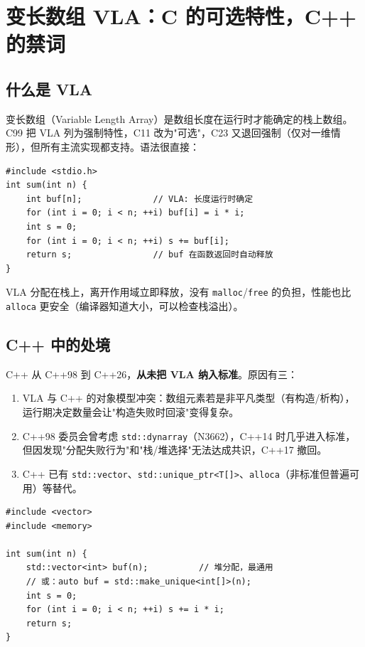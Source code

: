 \documentclass[12pt,a4paper,fontset=fandol]{ctexbook}
\newcommand{\cpplabel}{%
  \tcbox[on line,colback=cppheadbg,colframe=cppheadbg,
    boxrule=0pt,arc=1pt,left=2pt,right=2pt,top=1pt,bottom=1pt,
    colupper=white,fontupper=\scriptsize\bfseries]{C++}}
\newcommand{\clabel}{%
  \tcbox[on line,colback=cheadbg,colframe=cheadbg,
    boxrule=0pt,arc=1pt,left=2pt,right=2pt,top=1pt,bottom=1pt,
    colupper=white,fontupper=\scriptsize\bfseries]{C}}
\newcommand{\cpp}[1]{C++#1}
\newcommand{\kw}[1]{\texttt{#1}}
\begin{document}
\chapter{变长数组 VLA：C 的可选特性，C++ 的禁词}

\section{什么是 VLA}

变长数组（Variable Length Array）是数组长度在运行时才能确定的栈上数组。C99 把 VLA 列为强制特性，C11 改为"可选"，C23 又退回强制（仅对一维情形），但所有主流实现都支持。语法很直接：

\clabel{}
\begin{lstlisting}[style=cstyle]
#include <stdio.h>
int sum(int n) {
    int buf[n];              // VLA: 长度运行时确定
    for (int i = 0; i < n; ++i) buf[i] = i * i;
    int s = 0;
    for (int i = 0; i < n; ++i) s += buf[i];
    return s;                // buf 在函数返回时自动释放
}
\end{lstlisting}

VLA 分配在栈上，离开作用域立即释放，没有 \kw{malloc}/\allowbreak{}\kw{free} 的负担，性能也比 \kw{alloca} 更安全（编译器知道大小，可以检查栈溢出）。

\section{C++ 中的处境}

\cpp{} 从 C++98 到 C++26，\textbf{从未把 VLA 纳入标准}。原因有三：

\begin{enumerate}
  \item VLA 与 \cpp{} 的对象模型冲突：数组元素若是非平凡类型（有构造/析构），运行期决定数量会让"构造失败时回滚"变得复杂。
  \item C++98 委员会曾考虑 \kw{std::dynarray}（N3662），C++14 时几乎进入标准，但因发现"分配失败行为"和"栈/堆选择"无法达成共识，C++17 撤回。
  \item \cpp{} 已有 \kw{std::vector}、\kw{std::unique\_ptr<T[]>}、\kw{alloca}（非标准但普遍可用）等替代。
\end{enumerate}

\cpplabel{}
\begin{lstlisting}
#include <vector>
#include <memory>

int sum(int n) {
    std::vector<int> buf(n);          // 堆分配，最通用
    // 或：auto buf = std::make_unique<int[]>(n);
    int s = 0;
    for (int i = 0; i < n; ++i) s += i * i;
    return s;
}
\end{lstlisting}
\end{document}
